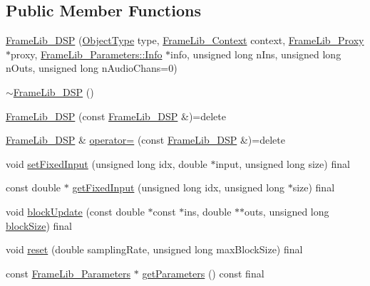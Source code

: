 \subsection*{Public Member Functions}
\begin{DoxyCompactItemize}
\item 
\hyperlink{class_frame_lib___d_s_p_a05ee5380cce6fa82c2b91c3f08693cc0}{Frame\+Lib\+\_\+\+D\+SP} (\hyperlink{_frame_lib___types_8h_a842c5e2e69277690b064bf363c017980}{Object\+Type} type, \hyperlink{class_frame_lib___context}{Frame\+Lib\+\_\+\+Context} context, \hyperlink{struct_frame_lib___proxy}{Frame\+Lib\+\_\+\+Proxy} $\ast$proxy, \hyperlink{class_frame_lib___parameters_1_1_info}{Frame\+Lib\+\_\+\+Parameters\+::\+Info} $\ast$info, unsigned long n\+Ins, unsigned long n\+Outs, unsigned long n\+Audio\+Chans=0)
\item 
\hyperlink{class_frame_lib___d_s_p_a2cf489678b72fe7e46956e69fac182ed}{$\sim$\+Frame\+Lib\+\_\+\+D\+SP} ()
\item 
\hyperlink{class_frame_lib___d_s_p_afd70a8e76dc70ac0fbe4d3f9a7a5beaf}{Frame\+Lib\+\_\+\+D\+SP} (const \hyperlink{class_frame_lib___d_s_p}{Frame\+Lib\+\_\+\+D\+SP} \&)=delete
\item 
\hyperlink{class_frame_lib___d_s_p}{Frame\+Lib\+\_\+\+D\+SP} \& \hyperlink{class_frame_lib___d_s_p_ab6c001c4768ed250fe9b223de1dc4d5f}{operator=} (const \hyperlink{class_frame_lib___d_s_p}{Frame\+Lib\+\_\+\+D\+SP} \&)=delete
\item 
void \hyperlink{class_frame_lib___d_s_p_a426afa0cf5d8f5c625619da2ccbf9be4}{set\+Fixed\+Input} (unsigned long idx, double $\ast$input, unsigned long size) final
\item 
const double $\ast$ \hyperlink{class_frame_lib___d_s_p_aabcf3bae08ab571f455f08bd7cf5e625}{get\+Fixed\+Input} (unsigned long idx, unsigned long $\ast$size) final
\item 
void \hyperlink{class_frame_lib___d_s_p_a106b275882df26129c1af0ab89487b65}{block\+Update} (const double $\ast$const $\ast$ins, double $\ast$$\ast$outs, unsigned long \hyperlink{_frame_lib___memory_8cpp_a8ef7d53a4cac28bf580a61f265fcaaa6}{block\+Size}) final
\item 
void \hyperlink{class_frame_lib___d_s_p_a0b0edaaaa82b80f3800918283a6a46f0}{reset} (double sampling\+Rate, unsigned long max\+Block\+Size) final
\item 
const \hyperlink{class_frame_lib___parameters}{Frame\+Lib\+\_\+\+Parameters} $\ast$ \hyperlink{class_frame_lib___d_s_p_ab1b692f7fe4340b7837319ceed334f02}{get\+Parameters} () const final
$$
\end{DoxyCompactItemize}
